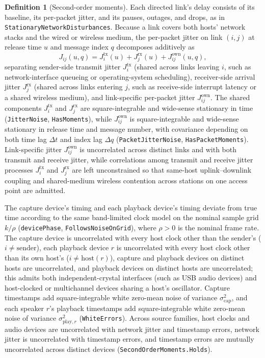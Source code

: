 \documentclass[11pt,a4paper]{article}
\newcommand{\lean}[1]{\texttt{#1}}
\theoremstyle{definition}
\newtheorem{definition}{Definition}[section]
\begin{document}
\begin{definition}[Second-order moments]
Each directed link's delay consists of its baseline, its per-packet jitter,
and its pauses, outages, and drops, as in
\lean{StationaryNetworkDisturbances}. Because a link covers both hosts'
network stacks and the wired or wireless medium, the per-packet jitter on
link $(i, j)$ at release time $u$ and message index $q$ decomposes
additively as
\[
  J_{ij}(u, q) = J^{\mathrm{tx}}_i(u) + J^{\mathrm{rx}}_j(u)
                 + J^{\mathrm{own}}_{ij}(u, q),
\]
separating sender-side transmit jitter $J^{\mathrm{tx}}_i$ (shared across
links leaving $i$, such as network-interface queueing or operating-system
scheduling), receiver-side arrival jitter $J^{\mathrm{rx}}_j$ (shared across
links entering $j$, such as receive-side interrupt latency or a shared
wireless medium), and link-specific per-packet jitter
$J^{\mathrm{own}}_{ij}$. The shared components $J^{\mathrm{tx}}_i$ and
$J^{\mathrm{rx}}_j$ are square-integrable and wide-sense stationary in
time (\lean{JitterNoise}, \lean{HasMoments}), while $J^{\mathrm{own}}_{ij}$
is square-integrable and wide-sense stationary in release time and message
number, with covariance depending on both time lag $\Delta t$ and index lag
$\Delta q$ (\lean{PacketJitterNoise}, \lean{HasPacketMoments}).
Link-specific jitter $J^{\mathrm{own}}_{ij}$ is uncorrelated across distinct
links and with both transmit and receive jitter, while correlations among
transmit and receive jitter processes $J^{\mathrm{tx}}_i$ and
$J^{\mathrm{rx}}_j$ are left unconstrained so that same-host
uplink--downlink coupling and shared-medium wireless contention across
stations on one access point are admitted.

The capture device's timing and each playback device's timing deviate from
true time according to the same band-limited clock model on the nominal sample
grid $k/\rho$ (\lean{devicePhase}, \lean{FollowsNoiseOnGrid}), where
$\rho > 0$ is the nominal frame rate. The capture device is uncorrelated with
every host clock other than the sender's ($i \ne \mathrm{sender}$), each
playback device $r$ is uncorrelated with every host clock other than its own
host's ($i \ne \mathrm{host}(r)$), capture and playback devices on distinct
hosts are uncorrelated, and playback devices on distinct hosts are
uncorrelated; this admits both independent-crystal interfaces (such as USB
audio devices) and host-clocked or multichannel devices sharing a host's
oscillator. Capture timestamps add square-integrable white zero-mean noise of
variance $\sigma_{\mathrm{cap}}^2$, and each speaker $r$'s playback
timestamps add square-integrable white zero-mean noise of variance
$\sigma_{\mathrm{play},r}^2$ (\lean{WhiteErrors}). Across source families,
host clocks and audio devices are uncorrelated with network jitter and
timestamp errors, network jitter is uncorrelated with timestamp errors, and
timestamp errors are mutually uncorrelated across distinct devices
(\lean{SecondOrderMoments.Holds}).
\end{definition}
\end{document}
